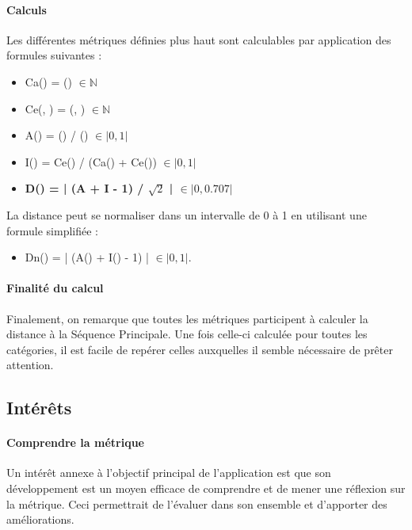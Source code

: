 \documentclass{scrartcl}
\begin{document}
    \paragraph{Calculs}Les différentes métriques définies plus haut sont calculables par application des formules suivantes : 
    \begin{itemize}
        \item Ca(\category{}) = \dependantClasses{}(\category{}) $\in \mathbb{N}$
        
        \item Ce(\category{}, \categoryUniverse{}) = \dependedClasses{}(\category{}, \categoryUniverse{}) $\in \mathbb{N}$
        
        \item A(\category{}) = 
        \numberOfabstractMethod{}(\category{}) /
        {\numberOfMethod{}(\category{})} $\in \lvert 0, 1\rvert$

        \item I(\category{}) = Ce(\category{}) / (Ca(\category{}) + Ce(\category{})) $\in \lvert 0, 1\rvert$
        
        \item \textbf{D(\category{}) = | (A + I - 1) / $\sqrt{2}$ | $\in \lvert 0, 0.707\rvert$}

    \end{itemize}
    
La distance peut se normaliser dans un intervalle de 0 à 1 en utilisant une formule simplifiée :
    \begin{itemize}
        \item Dn(\category{}) = | (A(\category{}) + I(\category{}) - 1) | $\in \lvert 0, 1\rvert$.
    \end{itemize}  

\paragraph{Finalité du calcul} Finalement, on remarque que toutes les métriques participent à calculer la distance à la Séquence Principale. Une fois celle-ci calculée pour toutes les catégories, il est facile de repérer celles auxquelles il semble nécessaire de prêter attention.

\subsection{Intérêts}
    
    \paragraph{Comprendre la métrique}Un intérêt annexe à l'objectif principal de l'application est que son développement est un moyen efficace de comprendre et de mener une réflexion sur la métrique. Ceci permettrait de l'évaluer dans son ensemble et d'apporter des améliorations.
    
\end{document}
